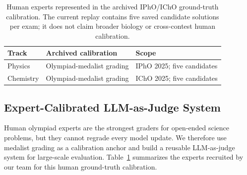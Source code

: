 \documentclass[11pt]{article}
\begin{document}
\begin{table}[ht]
\vspace{-0.2cm}
\centering
\scriptsize
\setlength{\tabcolsep}{4pt}
\renewcommand{\arraystretch}{1.15}
\begin{tabularx}{\columnwidth}{l X X}
\toprule
\textbf{Track} & \textbf{Archived calibration} & \textbf{Scope} \\
\midrule
Physics & Olympiad-medalist grading & IPhO 2025; five candidates \\
\midrule
Chemistry & Olympiad-medalist grading & IChO 2025; five candidates \\
\bottomrule
\end{tabularx}
\caption{Human experts represented in the archived IPhO/IChO ground-truth calibration. The current replay contains five saved candidate solutions per exam; it does not claim broader biology or cross-contest human calibration.}
\label{tab:human-graders}
\vspace{-0.3cm}
\end{table}



\subsection{Expert-Calibrated LLM-as-Judge System}
\label{sec:judge-system}
Human olympiad experts are the strongest graders for open-ended science problems, but they cannot regrade every model update.
We therefore use medalist grading as a calibration anchor and build a reusable LLM-as-judge system for large-scale evaluation.
Table~\ref{tab:human-graders} summarizes the experts recruited by our team for this human ground-truth calibration.
\end{document}
